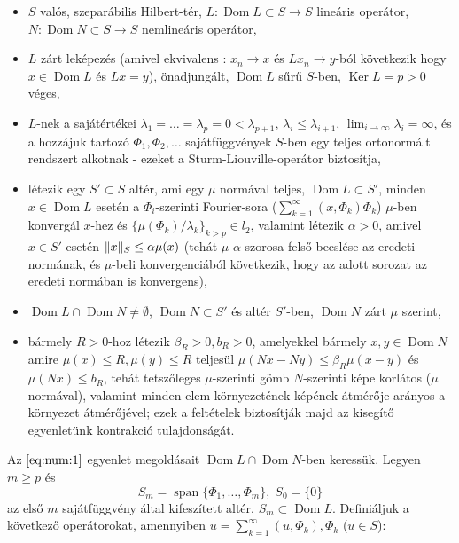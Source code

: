 \documentclass[oneside, titlepage, 12pt, a4paper]{report}
\DeclareMathOperator{\Ker}{Ker}	%
\DeclareMathOperator{\Dom}{Dom}	%
\DeclareMathOperator{\Span}{span}	%
\DeclarePairedDelimiter\norm{\lVert}{\rVert}	%
\begin{document}
\begin{itemize}
\item $S$ valós, szeparábilis Hilbert-tér, $L : \Dom L \subset S \rightarrow S$ lineáris operátor, $N : \Dom N \subset S \rightarrow S$ nemlineáris operátor,
\item $L$ zárt leképezés (amivel ekvivalens \cite{funkanal}: $x_n \rightarrow x$ és $Lx_n \rightarrow y$-ból következik hogy $x \in \Dom L$ és $Lx = y$), önadjungált, $\Dom L$ sűrű $S$-ben, $\Ker L = p > 0$ véges,
\item $L$-nek a sajátértékei $\lambda_1 = \dots = \lambda_p = 0 < \lambda_{p + 1}$, $\lambda_i \leq \lambda_{i + 1}$, $\lim_{i \to \infty} \lambda_i = \infty$, és a hozzájuk tartozó $\Phi_1, \Phi_2, \dots$ sajátfüggvények $S$-ben egy teljes ortonormált rendszert alkotnak - ezeket a Sturm-Liouville-operátor biztosítja, %
\item létezik egy $S' \subset S$ altér, ami egy $\mu$ normával teljes, $\Dom L \subset S'$, minden $x \in \Dom L$ esetén a $\Phi_i$-szerinti Fourier-sora ($\sum_{k=1}^\infty (x, \Phi_k) \Phi_k$) $\mu$-ben konvergál $x$-hez és $\{ \mu(\Phi_k) / \lambda_k\}_{k > p} \in l_2$, valamint létezik $\alpha > 0$, amivel $x \in S'$ esetén $\norm {x}_S \leq \alpha \mu(x)$ (tehát $\mu$ $\alpha$-szorosa felső becslése az eredeti normának, és $\mu$-beli konvergenciából következik, hogy az adott sorozat az eredeti normában is konvergens),
\item $\Dom L \cap \Dom N \neq \emptyset$, $\Dom N \subset S'$ és altér $S'$-ben, $\Dom N$ zárt $\mu$ szerint,
\item bármely $R > 0$-hoz létezik $\beta_R > 0, b_R > 0$, amelyekkel bármely $x, y \in \Dom N$ amire $\mu(x) \leq R, \mu(y) \leq R$ teljesül $\mu(Nx - Ny) \leq \beta_R \mu(x - y)$ és $\mu(Nx) \leq b_R$, tehát tetszőleges $\mu$-szerinti gömb $N$-szerinti képe korlátos ($\mu$ normával), valamint minden elem környezetének képének átmérője arányos a környezet átmérőjével; ezek a feltételek biztosítják majd az kisegítő egyenletünk kontrakció tulajdonságát. %
\end{itemize}
Az $\eqref{eq:num:1}$ egyenlet megoldásait $\Dom L \cap \Dom N$-ben keressük. Legyen $m \geq p$ és
\begin{equation*}
S_m = \Span \{\Phi_1, \dots, \Phi_m \}, \; S_0 = \{ 0\}
\end{equation*}
az első $m$ sajátfüggvény által kifeszített altér, $S_m \subset \Dom L$. Definiáljuk a következő operátorokat, amennyiben $u = \sum_{k = 1}^\infty (u, \Phi_k), \Phi_k$ ($u \in S$):
\end{document}
